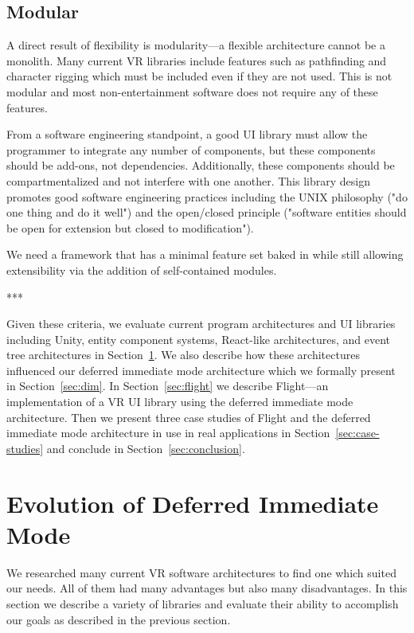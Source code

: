 \documentclass[conference,12pt]{IEEEtran}
\begin{document}
\subsection{Modular}\label{sec:modular}
A direct result of flexibility is modularity---a flexible architecture cannot be
a monolith. Many current VR libraries include features such as pathfinding and
character rigging which must be included even if they are not used. This is not
modular and most non-entertainment software does not require any of these
features.

From a software engineering standpoint, a good UI library must allow the
programmer to integrate any number of components, but these components should
be add-ons, not dependencies. Additionally, these components should be
compartmentalized and not interfere with one another. This library design
promotes good software engineering practices including the UNIX philosophy ("do
one thing and do it well") and the open/closed principle ("software entities
should be open for extension but closed to modification").

We need a framework that has a minimal feature set baked in while still allowing
extensibility via the addition of self-contained modules.

\begin{center}***\end{center}

Given these criteria, we evaluate current program architectures and UI libraries
including Unity, entity component systems, React-like architectures, and event
tree architectures in Section~\ref{sec:evolution}. We also describe how these
architectures influenced our deferred immediate mode architecture which we
formally present in Section~\ref{sec:dim}. In Section~\ref{sec:flight} we
describe Flight---an implementation of a VR UI library using the deferred
immediate mode architecture. Then we present three case studies of Flight and
the deferred immediate mode architecture in use in real applications in
Section~\ref{sec:case-studies} and conclude in Section~\ref{sec:conclusion}.

\section{Evolution of Deferred Immediate Mode}\label{sec:evolution}
We researched many current VR software architectures to find one which suited
our needs. All of them had many advantages but also many disadvantages. In this
section we describe a variety of libraries and evaluate their ability to
accomplish our goals as described in the previous section.
\end{document}

